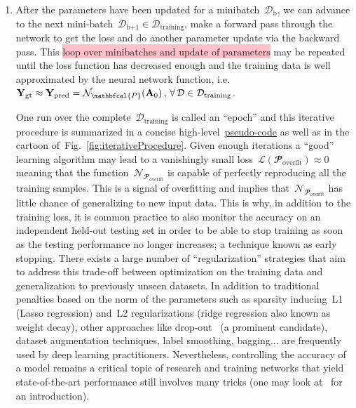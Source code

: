 \documentclass{article}
\newcommand{\mathcolorbox}[2]{\colorbox{#1}{$\displaystyle #2$}}
\begin{document}
\begin{enumerate}
\item After the parameters have been updated for a minibatch~$\mathcal{D}_\text{b}$, we can advance to the next mini-batch~$\mathcal{D}_\text{b+1} \in \mathcal{D}_\text{training}$, make a forward pass through the network to get the loss and do another parameter update via the backward pass.  This \mathcolorbox{pink}{\text{loop over minibatches and update of parameters}} may be repeated until the loss function has decreased enough and the training data is well approximated by the neural network function, i.e.~${\bf Y}_\text{gt} \approx {\bf Y}_\text{pred} = \mathcal{N}_\mathbfcal{P} ({\bf A}_0) \, , \, \forall \, \mathcal{D} \in \mathcal{D}_\text{training}$. 

One run over the complete~$\mathcal{D}_\text{training}$ is called an ``epoch'' and this iterative procedure is summarized in a concise high-level~\hyperlink{programmerNote}{pseudo-code} as well as in the cartoon of~Fig.~\ref{fig:iterativeProcedure}.  Given enough iterations a ``good'' learning algorithm may lead to a vanishingly small loss~$\mathcal{L} (\mathbfcal{P}_\text{overfit}) \approx 0$ meaning that the function~$\mathcal{N}_{\mathbfcal{P}_\text{overfit}}$ is capable of perfectly reproducing all the training samples.  This is a signal of overfitting and implies that~$\mathcal{N}_{\mathbfcal{P}_\text{overfit}}$ has little chance of generalizing to new input data.  This is why, in addition to the training loss, it is common practice to also monitor the accuracy on an independent held-out testing set in order to be able to stop training as soon as the testing performance no longer increases; a technique known as early stopping.  There exists a large number of ``regularization'' strategies that aim to address this trade-off between optimization on the training data and generalization to previously unseen datasets.  In addition to traditional penalties based on the norm of the parameters such as sparsity inducing~L1 (Lasso regression) and~L2 regularizations (ridge regression also known as weight decay), other approaches like drop-out~\cite{dropOut} (a prominent candidate), dataset augmentation techniques, label smoothing, bagging... are frequently used by deep learning practitioners. Nevertheless, controlling the accuracy of a model remains a critical topic of research and training networks that yield state-of-the-art performance still involves many tricks (one may look at~\cite{ng,deepLearningBookGoodfellow} for an introduction).

\end{enumerate}
\end{document}
